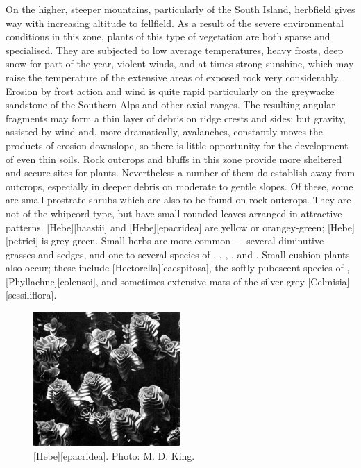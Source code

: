 On the higher, steeper mountains, particularly of the South Island, herbfield gives way with increasing altitude to fellfield.
As a result of the severe environmental conditions in this zone, plants of this type of vegetation are both sparse and specialised.
They are subjected to low average temperatures, heavy frosts, deep snow for part of the year, violent winds, and at times strong sunshine, which may raise the temperature of the extensive areas of exposed rock very considerably.
Erosion by frost action and wind is quite rapid particularly on the greywacke sandstone of the Southern Alps and other axial ranges.
The resulting angular fragments may form a thin layer of debris on ridge crests and sides; but gravity, assisted by wind and, more dramatically, avalanches, constantly moves the products of erosion downslope, so there is little opportunity for the development of even thin soils.
Rock outcrops and bluffs in this zone provide more sheltered and secure sites for plants.
Nevertheless a number of them do establish away from outcrops, especially in deeper debris on moderate to gentle slopes.
Of these, some are small prostrate  shrubs which are also to be found on rock outcrops.
They are not of the whipcord type, but have small rounded leaves arranged in attractive patterns. [Hebe][haastii] and [Hebe][epacridea] are yellow or orangey-green; [Hebe][petriei] is grey-green.
Small herbs are more common --- several diminutive grasses and sedges, and one to several species of , , , ,  and .
Small cushion plants also occur; these include [Hectorella][caespitosa], the softly pubescent species of , [Phyllachne][colensoi], and sometimes extensive mats of the silver grey [Celmisia][sessiliflora].

\begin{figure}
	\includegraphics[width=0.5\textwidth]{graphics/figure106hebe.jpg}
	\centering
	\caption[\emph{Hebe epacridea}]{[Hebe][epacridea].
	Photo: M. D. King.}%
	\label{fig:106hebe}
\end{figure}

